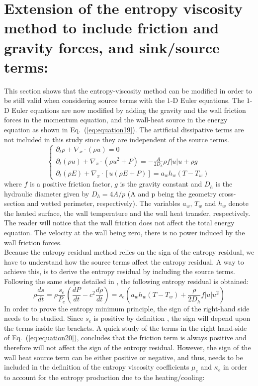 \documentclass{article}
\newcommand{\eqt}[1]{Eq.~(\ref{#1})}                     %
\begin{document}
\section{Extension of the entropy viscosity method to include friction and gravity forces, and sink/source terms:}
This section shows that the entropy-viscosity method can be modified in order to be still valid when considering source terms with the $1$-D Euler equations. The $1$-D Euler equations are now modified by adding the gravity and the wall friction forces in the momentum equation, and the wall-heat source in the energy equation as shown in \eqt{eq:equation19}. The artificial dissipative terms are not included in this study since they are independent of the source terms.
\begin{equation}
\label{eq:equation19}
\left\{
\begin{array}{lll}
\partial_t \rho + \nabla_x  \cdot \left( \rho u \right) = 0 \\
\partial_t \left( \rho u \right) + \nabla_x \cdot \left( \rho u^2 + P \right) =  - \frac{A}{2 D_h} \rho f |u| u + \rho g \\
\partial_t \left( \rho E \right) + \nabla_x \cdot \left[ u  \left( \rho E + P \right) \right] = a_w h_w \left( T - T_w \right)
\end{array}
\right.
\end{equation}
where $f$ is a positive friction factor, $g$ is the gravity constant and $D_h$ is the hydraulic diameter given by $D_h = 4A/p$ (A and p being the geometry cross-section and wetted perimeter, respectively). The variables $a_w$, $T_w$ and $h_w$ denote the heated surface, the wall temperature and the wall heat transfer, respectively.
The reader will notice that the wall friction does not affect the total energy equation. The velocity at the wall being zero, there is no power induced by the wall friction forces. \\
Because the entropy residual method relies on the sign of the entropy residual, we have to understand how the source terms affect the entropy residual. A way to achieve this, is to derive the entropy residual by including the source terms. Following the same steps detailed in \cite{jlg}, the following entropy residual is obtained:
\begin{equation}
\label{eq:equation20}
\rho \frac{ds}{dt} = \rho \frac{s_e}{P_e}\left( \frac{dP}{dt} - c^2 \frac{d \rho}{dt} \right) = s_e \left( a_w h_w (T - T_w) + \frac{\rho}{2 D_h} f |u| u^2 \right)
\end{equation}
In order to prove the entropy minimum principle, the sign of the right-hand side needs to be studied. Since $s_e$ is positive by definition \cite{jlg}, the sign will depend upon the terms inside the brackets. A quick study of the terms in the right hand-side of \eqt{eq:equation20}, concludes that the friction term is always positive and therefore will not affect the sign of the entropy residual. However, the sign of the wall heat source term can be either positive or negative, and thus, needs to be included in the definition of the entropy viscosity coefficients $\mu_e$ and $\kappa_e$ in order to account for the entropy production due to the heating/cooling:
\end{document}
